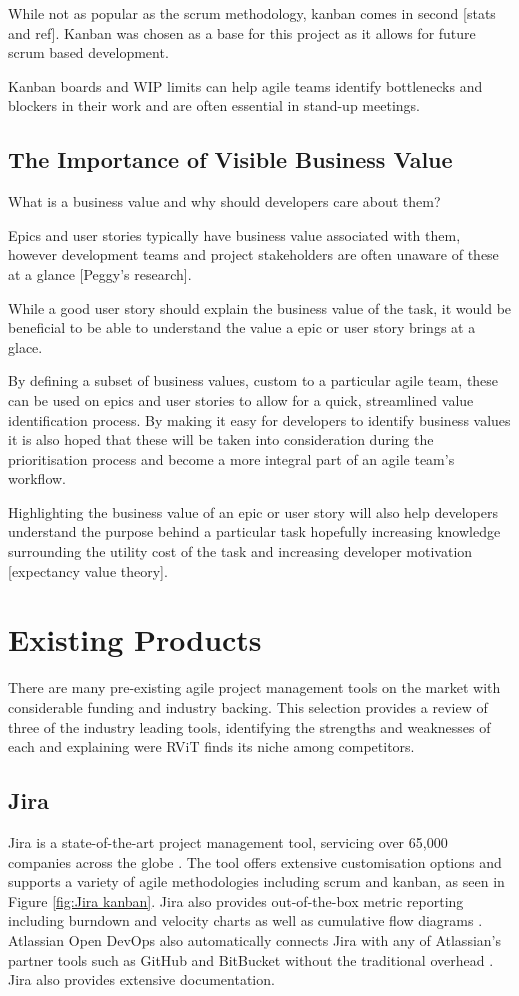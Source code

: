 \documentclass[l4proj.tex]{subfiles}
\begin{document}
While not as popular as the scrum methodology, kanban comes in second [stats and ref]. Kanban was chosen as a base for this project as it allows for future scrum based development.

Kanban boards and WIP limits can help agile teams identify bottlenecks and blockers in their work and are often essential in stand-up meetings. 

\subsection{The Importance of Visible Business Value}
What is a business value and why should developers care about them?

Epics and user stories typically have business value associated with them, however development teams and project stakeholders are often unaware of these at a glance [Peggy's research]. 

While a good user story should explain the business value of the task, it would be beneficial to be able to understand the value a epic or user story brings at a glace.

By defining a subset of business values, custom to a particular agile team, these can be used on epics and user stories to allow for a quick, streamlined value identification process. By making it easy for developers to identify business values it is also hoped that these will be taken into consideration during the prioritisation process and become a more integral part of an agile team's workflow. 

Highlighting the business value of an epic or user story will also help developers understand the purpose behind a particular task hopefully increasing knowledge surrounding the utility cost of the task and increasing developer motivation [expectancy value theory]. 

\section{Existing Products}
There are many pre-existing agile project management tools on the market with considerable funding and industry backing. This selection provides a review of three of the industry leading tools, identifying the strengths and weaknesses of each and explaining were RViT finds its niche among competitors.


\subsection{Jira}
Jira is a state-of-the-art project management tool, servicing over 65,000 companies across the globe \cite{JiraUsers}. The tool offers extensive customisation options and supports a variety of agile methodologies including scrum and kanban, as seen in Figure \ref{fig:Jira kanban}.
Jira also provides out-of-the-box metric reporting including burndown and velocity charts as well as cumulative flow diagrams \cite{JiraReports}. Atlassian Open DevOps also automatically connects Jira with any of Atlassian's partner tools such as GitHub and BitBucket without the traditional overhead \cite{JiraDevOps}. Jira also provides extensive documentation. 
\end{document}
